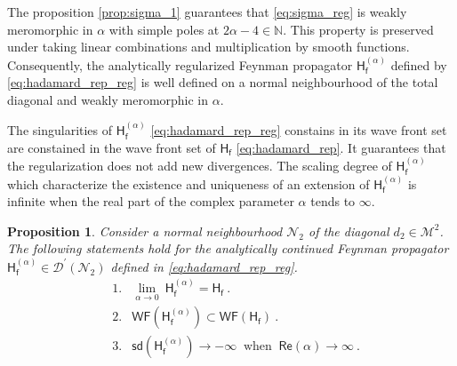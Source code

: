 \documentclass[11pt]{book}
\newcommand{\WF}{\mathsf{WF}}
\newcommand{\sd}{\mathsf{sd}}
\renewcommand{\Re}{\mathsf{Re}}
\newcommand{\Dcal}{\mathcal{D}}
\newcommand{\Mcal}{\mathcal{M}}
\newcommand{\Ncal}{\mathcal{N}}
\newcommand{\Nbb}{\mathbb{N}}
\newcommand{\Hsf}{\mathsf{H}}
\newcommand{\fsf}{\mathsf{f}}
\theoremstyle{break}
\newtheorem{proposition}{Proposition}
\begin{document}
The proposition \ref{prop:sigma_1} guarantees that \eqref{eq:sigma_reg} is weakly meromorphic in $\alpha$ with simple poles at $2\alpha-4\in\Nbb$. This property is preserved under taking linear combinations and multiplication by smooth functions. Consequently, the analytically regularized Feynman propagator $\Hsf^{(\alpha)}_\fsf$ defined by \eqref{eq:hadamard_rep_reg} is well defined on a normal neighbourhood of the total diagonal and weakly meromorphic in $\alpha$. 


The singularities of $\Hsf^{(\alpha)}_\fsf$ \eqref{eq:hadamard_rep_reg} constains in its wave front set are constained in the wave front set of $\Hsf_\fsf$ \eqref{eq:hadamard_rep}. It guarantees that the regularization does not add new divergences. The scaling degree of $\Hsf^{(\alpha)}_\fsf$  which characterize the existence and uniqueness of an extension of $\Hsf^{(\alpha)}_\fsf$ is infinite when the real part of the complex parameter $\alpha$ tends to $\infty$.


\begin{proposition}
Consider a normal neighbourhood $\Ncal_2$ of the diagonal $d_2\in\Mcal^2$. The following statements hold for the analytically continued Feynman propagator $\Hsf^{(\alpha)}_\fsf\in\Dcal^\prime(\Ncal_2)$ defined in \eqref{eq:hadamard_rep_reg}.
%
\begin{eqnarray*}
&\mbox{1.}& \underset{\alpha \to 0}{\lim} \ \Hsf^{(\alpha)}_\fsf = \Hsf_\fsf \ . \\
&\mbox{2.}& \WF\left(\Hsf^{(\alpha)}_\fsf\right) \subset \WF\left(\Hsf_\fsf\right) \ . \\
&\mbox{3.}& \sd\left(\Hsf^{(\alpha)}_\fsf\right) \to - \infty \ \mbox{ when } \ \Re\left(\alpha\right) \to \infty \ .  
\end{eqnarray*}
%
\end{proposition}
\end{document}

